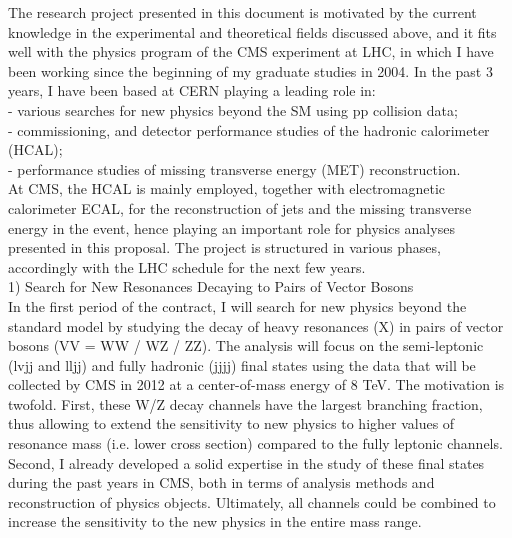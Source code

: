 \documentclass[10pt, a4paper]{article}
\begin{document}
The research project presented in this document 
is motivated by the current knowledge in the experimental and 
theoretical fields discussed above, and it fits well with 
the physics program of the CMS experiment at LHC, in which 
I have been working since the beginning of my graduate studies in 2004.
In the past 3 years, I have been based at CERN playing a leading role in: \\ 
- various searches for new physics beyond the SM using pp collision data;\\
- commissioning, and detector performance studies of the hadronic calorimeter (HCAL); \\
- performance studies of missing transverse energy (MET) reconstruction. \\
At CMS, the HCAL is mainly employed, together 
with electromagnetic calorimeter ECAL, for the reconstruction 
of jets and the missing transverse energy in the event, 
hence playing an important role for physics analyses presented in this proposal.
The project is structured in various phases, accordingly with the 
LHC schedule for the next few years.\\

1) Search for New Resonances Decaying to Pairs of Vector Bosons\\
In the first period of the contract, I will search for new physics beyond the 
standard model by studying the decay of heavy resonances (X) in pairs of vector bosons
(VV = WW / WZ / ZZ). The analysis will focus on the semi-leptonic (lvjj and lljj) and 
fully hadronic (jjjj) final states using the data that will be collected by CMS in 2012
at a center-of-mass energy of 8 TeV. 
The motivation is twofold. First, these W/Z decay channels have the largest 
branching fraction, thus allowing to extend the sensitivity to new physics to higher values of 
resonance mass (i.e. lower cross section) compared to the 
fully leptonic channels. Second, I already developed a solid expertise in 
the study of these final states during the past years in CMS, both in terms of 
analysis methods and reconstruction of physics objects. Ultimately, all channels 
could be combined to increase the sensitivity to the new physics in the entire mass range.
\end{document}
